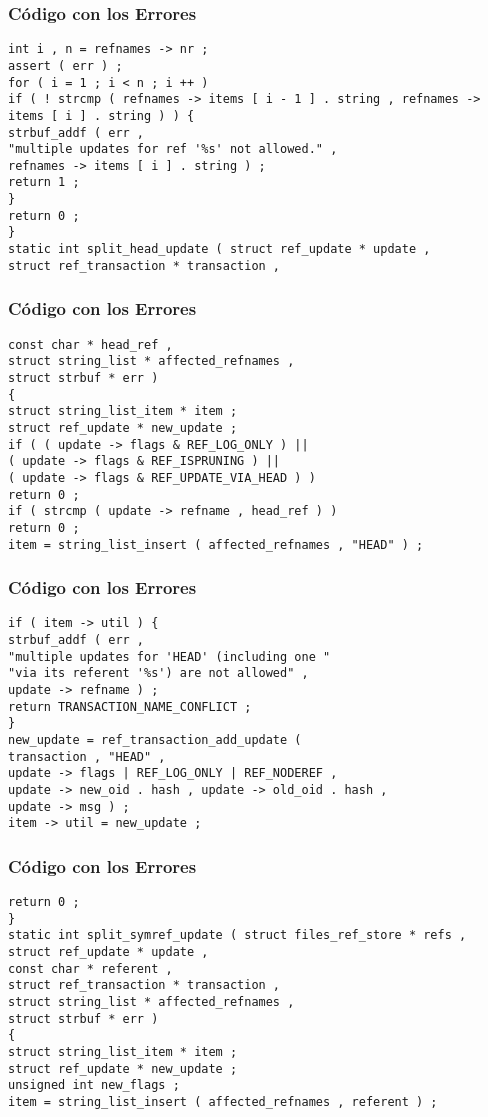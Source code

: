 \documentclass{beamer}
\begin{document}
\begin{frame}[fragile]
\frametitle{C\'odigo con los Errores}
\begin{verbatim}
int i , n = refnames -> nr ; 
assert ( err ) ; 
for ( i = 1 ; i < n ; i ++ ) 
if ( ! strcmp ( refnames -> items [ i - 1 ] . string , refnames -> items [ i ] . string ) ) { 
strbuf_addf ( err , 
"multiple updates for ref '%s' not allowed." , 
refnames -> items [ i ] . string ) ; 
return 1 ; 
} 
return 0 ; 
} 
static int split_head_update ( struct ref_update * update , 
struct ref_transaction * transaction , 
\end{verbatim}
\end{frame}
\begin{frame}[fragile]
\frametitle{C\'odigo con los Errores}
\begin{verbatim}
const char * head_ref , 
struct string_list * affected_refnames , 
struct strbuf * err ) 
{ 
struct string_list_item * item ; 
struct ref_update * new_update ; 
if ( ( update -> flags & REF_LOG_ONLY ) || 
( update -> flags & REF_ISPRUNING ) || 
( update -> flags & REF_UPDATE_VIA_HEAD ) ) 
return 0 ; 
if ( strcmp ( update -> refname , head_ref ) ) 
return 0 ; 
item = string_list_insert ( affected_refnames , "HEAD" ) ; 
\end{verbatim}
\end{frame}
\begin{frame}[fragile]
\frametitle{C\'odigo con los Errores}
\begin{verbatim}
if ( item -> util ) { 
strbuf_addf ( err , 
"multiple updates for 'HEAD' (including one " 
"via its referent '%s') are not allowed" , 
update -> refname ) ; 
return TRANSACTION_NAME_CONFLICT ; 
} 
new_update = ref_transaction_add_update ( 
transaction , "HEAD" , 
update -> flags | REF_LOG_ONLY | REF_NODEREF , 
update -> new_oid . hash , update -> old_oid . hash , 
update -> msg ) ; 
item -> util = new_update ; 
\end{verbatim}
\end{frame}
\begin{frame}[fragile]
\frametitle{C\'odigo con los Errores}
\begin{verbatim}
return 0 ; 
} 
static int split_symref_update ( struct files_ref_store * refs , 
struct ref_update * update , 
const char * referent , 
struct ref_transaction * transaction , 
struct string_list * affected_refnames , 
struct strbuf * err ) 
{ 
struct string_list_item * item ; 
struct ref_update * new_update ; 
unsigned int new_flags ; 
item = string_list_insert ( affected_refnames , referent ) ; 
\end{verbatim}
\end{frame}
\end{document}
